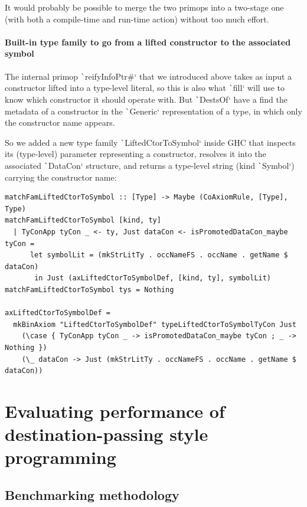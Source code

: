 \documentclass[english]{jflart}
\begin{document}
It would probably be possible to merge the two primops into a two-stage one (with both a compile-time and run-time action) without too much effort.

\paragraph{Built-in type family to go from a lifted constructor to the associated symbol}

The internal primop \texttt`reifyInfoPtr#` that we introduced above takes as input a constructor lifted into a type-level literal, so this is also what \texttt`fill` will use to know which constructor it should operate with. But \texttt`DestsOf` have a find the metadata of a constructor in the \texttt`Generic` representation of a type, in which only the constructor name appears.

So we added a new type family \texttt`LiftedCtorToSymbol` inside GHC that inspects its (type-level) parameter representing a constructor, resolves it into the associated \texttt`DataCon` structure, and returns a type-level string (kind \texttt`Symbol`) carrying the constructor name:
{\small
\begin{verbatim}
matchFamLiftedCtorToSymbol :: [Type] -> Maybe (CoAxiomRule, [Type], Type)
matchFamLiftedCtorToSymbol [kind, ty]
  | TyConApp tyCon _ <- ty, Just dataCon <- isPromotedDataCon_maybe tyCon =
      let symbolLit = (mkStrLitTy . occNameFS . occName . getName $ dataCon)
       in Just (axLiftedCtorToSymbolDef, [kind, ty], symbolLit)
matchFamLiftedCtorToSymbol tys = Nothing

axLiftedCtorToSymbolDef =
  mkBinAxiom "LiftedCtorToSymbolDef" typeLiftedCtorToSymbolTyCon Just
    (\case { TyConApp tyCon _ -> isPromotedDataCon_maybe tyCon ; _ -> Nothing })
    (\_ dataCon -> Just (mkStrLitTy . occNameFS . occName . getName $ dataCon))
\end{verbatim}
}

\section{Evaluating performance of destination-passing style programming}\label{sec:benchmark}

\subsection{Benchmarking methodology}
\end{document}
